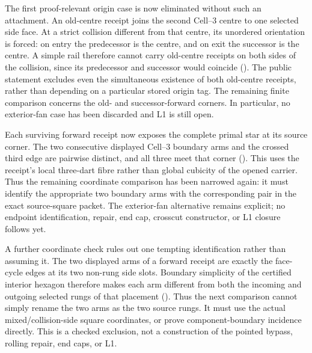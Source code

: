 \documentclass[11pt]{article}
\theoremstyle{definition}
\begin{document}
The first proof-relevant origin case is now eliminated without such an
attachment.  An old-centre receipt joins the second Cell--3 centre to one
selected side face.  At a strict collision different from that centre, its
unordered orientation is forced: on entry the predecessor is the centre, and
on exit the successor is the centre.  A simple rail therefore cannot carry
old-centre receipts on both sides of the collision, since its predecessor and
successor would coincide
().
The public statement excludes even the simultaneous existence of both
old-centre receipts, rather than depending on a particular stored origin tag.
The remaining finite comparison concerns the old- and successor-forward
corners.  In particular, no exterior-fan case has been discarded and L1 is
still open.

Each surviving forward receipt now exposes the complete primal star at its
source corner.  The two consecutive displayed Cell--3 boundary arms and the
crossed third edge are pairwise distinct, and all three meet that corner
().
This uses the receipt's local three-dart fibre rather than global cubicity of
the opened carrier.  Thus the remaining coordinate comparison has been
narrowed again: it must identify the appropriate two boundary arms with the
corresponding pair in the exact source-square packet.  The exterior-fan
alternative remains explicit; no endpoint identification, repair, end cap,
crosscut constructor, or L1 closure follows yet.

A further coordinate check rules out one tempting identification rather than
assuming it.  The two displayed arms of a forward receipt are exactly the
face-cycle edges at its two non-rung side slots.  Boundary simplicity of the
certified interior hexagon therefore makes each arm different from both the
incoming and outgoing selected rungs of that placement
().
Thus the next comparison cannot simply rename the two arms as the two source
rungs.  It must use the actual mixed/collision-side square coordinates, or
prove component-boundary incidence directly.  This is a checked exclusion,
not a construction of the pointed bypass, rolling repair, end caps, or L1.
\end{document}
